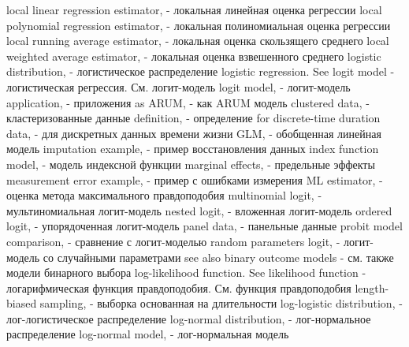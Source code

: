 local linear regression estimator, - локальная линейная оценка регрессии
local polynomial regression estimator, - локальная полиномиальная оценка регрессии
local running average estimator, - локальная оценка скользящего среднего
local weighted average estimator, - локальная оценка взвешенного среднего
logistic distribution, - логистическое распределение
logistic regression. See logit model - логистическая регрессия. См. логит-модель
logit model, - логит-модель
application, - приложения
as ARUM, - как ARUM модель
clustered data, - кластеризованные данные
definition, - определение
for discrete-time duration data, - для дискретных данных времени жизни
GLM, - обобщенная линейная модель
imputation example, - пример восстановления данных
index function model, - модель индексной функции
marginal effects, - предельные эффекты
measurement error example, - пример с ошибками измерения
ML estimator, - оценка метода максимального правдоподобия
multinomial logit, - мультиномиальная логит-модель
nested logit, - вложенная логит-модель
ordered logit, - упорядоченная логит-модель
panel data, - панельные данные
probit model comparison, - сравнение с логит-моделью
random parameters logit, - логит-модель со случайными параметрами
see also binary outcome models - см. также модели бинарного выбора
log-likelihood function. See likelihood function - логарифмическая функция правдоподобия. См. функция правдоподобия
length-biased sampling, - выборка основанная на длительности
log-logistic distribution, - лог-логистическое распределение
log-normal distribution, - лог-нормальное распределение
log-normal model, - лог-нормальная модель

